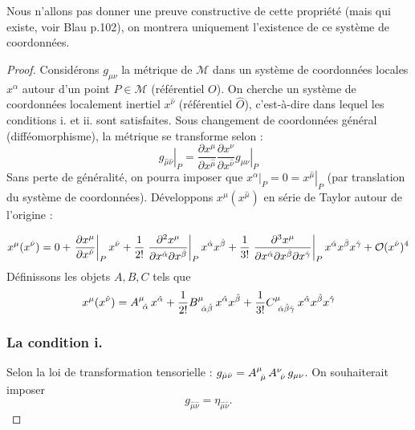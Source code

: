 Nous n'allons pas donner une preuve constructive de cette propriété (mais qui existe, voir Blau p.102), on montrera uniquement l'existence de ce système de coordonnées. 
\begin{proof}
Considérons $g_{\mu \nu}$ la métrique de $\mathcal{M}$ dans un système de coordonnées locales $x^{\alpha}$ autour d'un point $P \in \mathcal{M}$ (référentiel $O$). On cherche un système de coordonnées localement inertiel $x^{\hat{\nu}}$ (référentiel $\hat{O}$), c'est-à-dire dans lequel les conditions i. et ii. sont satisfaites. Sous changement de coordonnées général (difféomorphisme), la métrique se transforme selon : 
\begin{equation}
    \left. g_{\hat{\mu}\hat{\nu}} \right|_P = \frac{\partial x^{\mu}}{\partial x^{\hat{\mu}}}\frac{\partial x^{\nu}}{\partial x^{\hat{\nu}}} \left. g_{\mu \nu} \right|_P
\end{equation}
Sans perte de généralité, on pourra imposer que $\left. x^{\alpha} \right|_P = 0 = \left. x^{\hat{\mu}} \right|_P$ (par translation du système de coordonnées). Développons $x^\mu (x^{\hat{\mu}})$ en série de Taylor autour de l'origine :

\begin{equation}
    x^{\mu}(x^{\hat{\nu}}) = 0 + \left. \frac{\partial x^{\mu}}{\partial x^{\hat{\nu}}} \right|_Px^{\hat{\nu}} + \frac{1}{2!}\left. \frac{\partial^2 x^{\mu}}{\partial x^{\hat{\alpha}} \partial x^{\hat{\beta}}} \right|_Px^{\hat{\alpha}} x^{\hat{\beta}}+ \frac{1}{3!}\left. \frac{\partial^3 x^{\mu}}{\partial x^{\hat{\alpha}}\partial x^{\hat{\beta}}\partial x^{\hat{\gamma}}} \right|_Px^{\hat{\alpha}}x^{\hat{\beta}}x^{\hat{\gamma}} + \mathcal{O}(x^{\hat{\nu}} )^4
    \label{Taylor d'anciennes à nouvelles coordonnées}
\end{equation}
Définissons les objets $A,B,C$ tels que
\begin{equation}
    x^{\mu}(x^{\hat{\nu}}) = A\indices{^\mu_{\!\hat{\alpha}}}\,x^{\hat{\alpha}} + \frac{1}{2!}B\indices{^{\mu}_{\!\hat{\alpha} \hat{\beta}}} \, x^{\hat{\alpha}}x^{\hat{\beta}} + \frac{1}{3!}C\indices{^{\mu}_{\!\hat{\alpha}\hat{\beta}\hat{\gamma}}}\,x^{\hat{\alpha}}x^{\hat{\beta}} x^{\hat{\gamma}}
\end{equation}
\subsubsection{La condition i.}

Selon la loi de transformation tensorielle : $g_{\hat{\mu}\hat{\nu}} = A\indices{^{\mu}_{\!\hat{\mu}}}\, A\indices{^{\nu}_{\!\hat{\nu}}}\,g_{\mu \nu}$. On souhaiterait imposer
\begin{equation}
    g_{\hat{\mu}\hat{\nu}} = \eta_{\hat{\mu}\hat{\nu}}.
\end{equation}


\end{proof}
